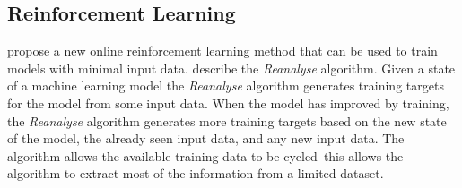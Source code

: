 \subsection{Reinforcement Learning}
  \citeauthor{onlineRL} \cite{onlineRL} propose a new online reinforcement learning method that can be used to train models with minimal input data.
  \citeauthor{onlineRL} describe the \textit{Reanalyse} algorithm.
  Given a state of a machine learning model the \textit{Reanalyse} algorithm generates training targets for the model from some input data.
  When the model has improved by training, the \textit{Reanalyse} algorithm generates more training targets based on the new state of the model, the already seen input data, and any new input data.
  The algorithm allows the available training data to be cycled--this allows the algorithm to extract most of the information from a limited dataset.
